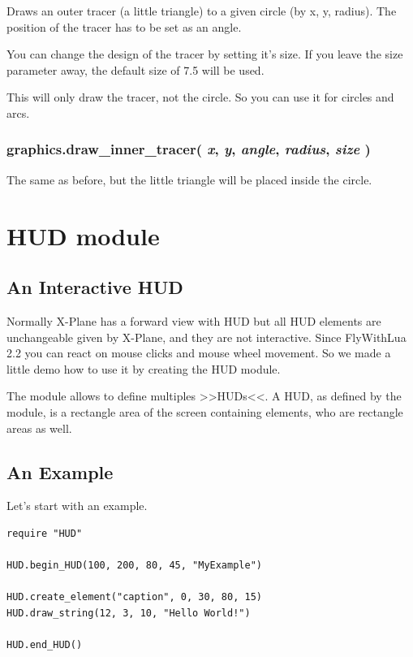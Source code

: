\documentclass[11pt,parskip=half,a4paper]{scrartcl}
\begin{document}
Draws an outer tracer (a little triangle) to a given circle (by x, y, radius). The position of the tracer has to be set as an angle.

You can change the design of the tracer by setting it's size. If you leave the size parameter away, the default size of 7.5 will be used.

This will only draw the tracer, not the circle. So you can use it for circles and arcs.

\subsubsection{graphics.draw\_inner\_tracer( \emph{x}, \emph{y}, \emph{angle}, \emph{radius}, \emph{size} )}

The same as before, but the little triangle will be placed inside the circle.

\newpage
\section{HUD module}

\subsection{An Interactive HUD}

Normally X-Plane has a forward view with HUD but all HUD elements are unchangeable given by X-Plane, and they are not interactive. Since FlyWithLua 2.2 you can react on mouse clicks and mouse wheel movement. So we made a little demo how to use it by creating the HUD module.

The module allows to define multiples >>HUDs<<. A HUD, as defined by the module, is a rectangle area of the screen containing elements, who are rectangle areas as well.

\subsection{An Example}

Let's start with an example.

\begin{lstlisting}[firstnumber=1]
require "HUD"

HUD.begin_HUD(100, 200, 80, 45, "MyExample")

HUD.create_element("caption", 0, 30, 80, 15)
HUD.draw_string(12, 3, 10, "Hello World!")

HUD.end_HUD()
\end{lstlisting}
\end{document}

